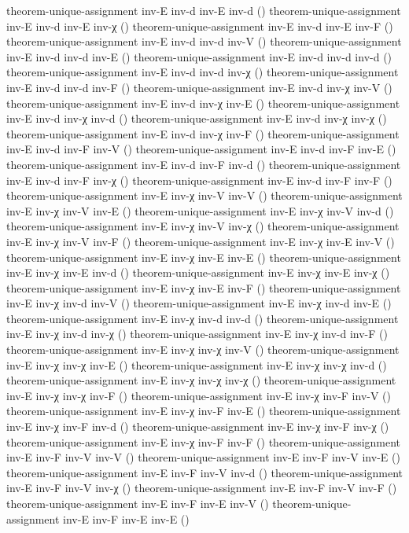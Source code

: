 \documentclass[11pt,a4paper]{article}
\begin{document}
\begin{code}
theorem-unique-assignment inv-E inv-d inv-E inv-d ()
theorem-unique-assignment inv-E inv-d inv-E inv-χ ()
theorem-unique-assignment inv-E inv-d inv-E inv-F ()
theorem-unique-assignment inv-E inv-d inv-d inv-V ()
theorem-unique-assignment inv-E inv-d inv-d inv-E ()
theorem-unique-assignment inv-E inv-d inv-d inv-d ()
theorem-unique-assignment inv-E inv-d inv-d inv-χ ()
theorem-unique-assignment inv-E inv-d inv-d inv-F ()
theorem-unique-assignment inv-E inv-d inv-χ inv-V ()
theorem-unique-assignment inv-E inv-d inv-χ inv-E ()
theorem-unique-assignment inv-E inv-d inv-χ inv-d ()
theorem-unique-assignment inv-E inv-d inv-χ inv-χ ()
theorem-unique-assignment inv-E inv-d inv-χ inv-F ()
theorem-unique-assignment inv-E inv-d inv-F inv-V ()
theorem-unique-assignment inv-E inv-d inv-F inv-E ()
theorem-unique-assignment inv-E inv-d inv-F inv-d ()
theorem-unique-assignment inv-E inv-d inv-F inv-χ ()
theorem-unique-assignment inv-E inv-d inv-F inv-F ()
theorem-unique-assignment inv-E inv-χ inv-V inv-V ()
theorem-unique-assignment inv-E inv-χ inv-V inv-E ()
theorem-unique-assignment inv-E inv-χ inv-V inv-d ()
theorem-unique-assignment inv-E inv-χ inv-V inv-χ ()
theorem-unique-assignment inv-E inv-χ inv-V inv-F ()
theorem-unique-assignment inv-E inv-χ inv-E inv-V ()
theorem-unique-assignment inv-E inv-χ inv-E inv-E ()
theorem-unique-assignment inv-E inv-χ inv-E inv-d ()
theorem-unique-assignment inv-E inv-χ inv-E inv-χ ()
theorem-unique-assignment inv-E inv-χ inv-E inv-F ()
theorem-unique-assignment inv-E inv-χ inv-d inv-V ()
theorem-unique-assignment inv-E inv-χ inv-d inv-E ()
theorem-unique-assignment inv-E inv-χ inv-d inv-d ()
theorem-unique-assignment inv-E inv-χ inv-d inv-χ ()
theorem-unique-assignment inv-E inv-χ inv-d inv-F ()
theorem-unique-assignment inv-E inv-χ inv-χ inv-V ()
theorem-unique-assignment inv-E inv-χ inv-χ inv-E ()
theorem-unique-assignment inv-E inv-χ inv-χ inv-d ()
theorem-unique-assignment inv-E inv-χ inv-χ inv-χ ()
theorem-unique-assignment inv-E inv-χ inv-χ inv-F ()
theorem-unique-assignment inv-E inv-χ inv-F inv-V ()
theorem-unique-assignment inv-E inv-χ inv-F inv-E ()
theorem-unique-assignment inv-E inv-χ inv-F inv-d ()
theorem-unique-assignment inv-E inv-χ inv-F inv-χ ()
theorem-unique-assignment inv-E inv-χ inv-F inv-F ()
theorem-unique-assignment inv-E inv-F inv-V inv-V ()
theorem-unique-assignment inv-E inv-F inv-V inv-E ()
theorem-unique-assignment inv-E inv-F inv-V inv-d ()
theorem-unique-assignment inv-E inv-F inv-V inv-χ ()
theorem-unique-assignment inv-E inv-F inv-V inv-F ()
theorem-unique-assignment inv-E inv-F inv-E inv-V ()
theorem-unique-assignment inv-E inv-F inv-E inv-E ()

\end{code}
\end{document}
